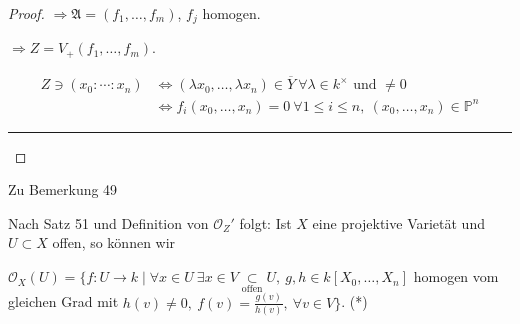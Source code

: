 \begin{proof}
  $\Rightarrow\mathfrak{A}=(f_{1},\ldots,f_{m})$, $f_{j}$ homogen.

  $\Rightarrow Z=V_{+}(f_{1},\ldots,f_{m})$. 

  \begin{align*}
    Z\ni(x_{0}:\cdots:x_{n}) & \Leftrightarrow(\lambda x_{0},\ldots,\lambda x_{n})\in\overline{Y}\ \forall\lambda\in k^{\times}\text{ und }\neq0\\
                             & \Leftrightarrow f_{i}(x_{0},\ldots,x_{n})=0\ \forall1\leq i\leq n,\ (x_{0},\ldots,x_{n})\in\mathbb{P}^{n}
  \end{align*}

  \rule[0.5ex]{1\columnwidth}{1pt}
\end{proof}
Zu Bemerkung 49 

Nach Satz 51 und Definition von $\mathcal{O}_{Z}'$ folgt: Ist $X$
eine projektive Varietät und $U\subset X$ offen, so können wir 

$\mathcal{O}_{X}(U)=\{f:U\rightarrow k\mid\forall x\in U\ \exists x\in V\underset{\text{offen}}{\subset}U,\ g,h\in k[X_{0},\ldots,X_{n}]$
homogen vom gleichen Grad mit $h(v)\neq0,\ f(v)=\frac{g(v)}{h(v)},\ \forall v\in V\}$.
({*}) 

